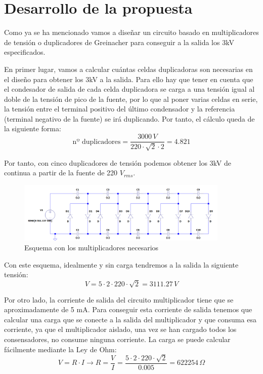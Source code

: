 \section{Desarrollo de la propuesta}

Como ya se ha mencionado vamos a diseñar un circuito basado en multiplicadores 
de tensión o duplicadores de Greinacher para conseguir a la salida los 3kV 
especificados. 

En primer lugar, vamos a calcular cuántas celdas duplicadoras son necesarias 
en el diseño para obtener los 3kV a la salida. Para ello hay que tener en cuenta que el condesador 
de salida de
cada celda duplicadora se carga a una tensión igual al doble de la tensión de pico de la fuente, por lo que 
al poner varias celdas en serie, la tensión entre el terminal positivo del último condensador 
y la referencia (terminal negativo de la fuente) se irá duplicando. Por tanto, el cálculo 
queda de la siguiente forma:
\begin{equation}
    \text{nº duplicadores} = \frac{3000\,V}{220\cdot\sqrt{2}\cdot2} = 4.821
\end{equation}

Por tanto, con cinco duplicadores de tensión podemos obtener los 3kV de continua a partir 
de la fuente de 220 $V_{rms}$. 
\begin{figure}[H]
    \centering
    \includegraphics[width=0.9\textwidth]{img/mult_final.png}
    \caption{Esquema con los multiplicadores necesarios}
    \label{fig:esquema_mult}
\end{figure}

Con este esquema, idealmente y sin carga tendremos a la salida la siguiente tensión:
\begin{equation}
    V = 5\cdot2\cdot220\cdot\sqrt{2} = 3111.27\,V
\end{equation}

Por otro lado, la corriente de salida del circuito multiplicador tiene que se 
aproximadamente de 5 mA. Para conseguir esta corriente de salida tenemos que calcular 
una carga que se conecte a la salida del multiplicador y que consuma esa corriente, ya que el multiplicador 
aislado, una vez se han cargado todos los consensadores, no consume ninguna corriente. La carga 
se puede calcular fácilmente mediante la Ley de Ohm:
\begin{equation}
    V = R\cdot I \rightarrow R = \frac{V}{I} = \frac{5\cdot2\cdot220\cdot\sqrt{2}}{0.005} = 622254\,\Omega
\end{equation}

